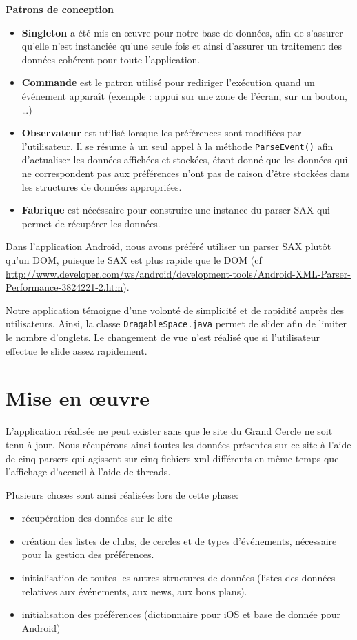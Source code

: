 \documentclass[a4paper, 11px]{article}
\begin{document}
{\bf Patrons de conception}

\begin{itemize}
	\item {\bf Singleton} a été mis en œuvre pour notre base de données, afin de s'assurer qu'elle n'est instanciée qu'une seule fois et ainsi d'assurer un traitement des données cohérent pour toute l'application.\\
	\item {\bf Commande} est le patron utilisé pour rediriger l'exécution quand un événement apparaît (exemple : appui sur une zone de l'écran, sur un bouton, \dots)\\
	\item {\bf Observateur} est utilisé lorsque les préférences sont modifiées par l'utilisateur. Il se résume à un seul appel à la méthode \texttt{ParseEvent()} afin d'actualiser les données affichées et stockées, étant donné que les données qui ne correspondent pas aux préférences n'ont pas de raison d'être stockées dans les structures de données appropriées.
	\item {\bf Fabrique} est nécéssaire pour construire une instance du parser SAX qui permet de récupérer les données.
\end{itemize}
Dans l'application Android, nous avons préféré utiliser un parser SAX plutôt qu'un DOM, puisque le SAX est plus rapide que le DOM (cf \href{http://www.developer.com/ws/android/development-tools/Android-XML-Parser-Performance-3824221-2.htm}{http://www.developer.com/ws/android/development-tools/Android-XML-Parser-Performance-3824221-2.htm}).



Notre application témoigne d'une volonté de simplicité et de rapidité auprès des utilisateurs. Ainsi, la classe \texttt{DragableSpace.java} permet de \og slider \fg afin de limiter le nombre d'onglets. Le changement de vue n'est réalisé que si l'utilisateur effectue le slide assez rapidement.

\section{Mise en œuvre}

L'application réalisée ne peut exister sans que le site du Grand Cercle ne soit tenu à jour. Nous récupérons ainsi toutes les données présentes sur ce site à l'aide de cinq parsers qui agissent sur cinq fichiers xml différents en même temps que l'affichage d'accueil à l'aide de threads.

\noindent Plusieurs choses sont ainsi réalisées lors de cette phase:
\begin{itemize}
\item récupération des données sur le site
\item création des listes de clubs, de cercles et de types d'événements, nécessaire pour la gestion des préférences.
\item initialisation de toutes les autres structures de données (listes des données relatives aux événements, aux news, aux bons plans).
\item initialisation des préférences (dictionnaire pour iOS et base de donnée pour Android)
\end{itemize}
\end{document}
